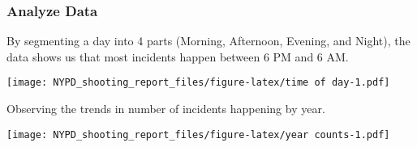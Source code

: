 \documentclass[
]{article}
\begin{document}
\hypertarget{analyze-data}{%
\subsubsection{Analyze Data}\label{analyze-data}}

By segmenting a day into 4 parts (Morning, Afternoon, Evening, and
Night), the data shows us that most incidents happen between 6 PM and 6
AM.

\texttt{[image: NYPD\_shooting\_report\_files/figure-latex/time of day-1.pdf]}

Observing the trends in number of incidents happening by year.

\texttt{[image: NYPD\_shooting\_report\_files/figure-latex/year counts-1.pdf]}
\end{document}
